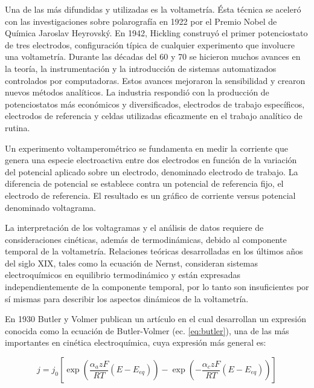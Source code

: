 		Una de las más difundidas y utilizadas es la voltametría. Ésta técnica se aceleró con las investigaciones sobre polarografía en 1922 por el Premio Nobel de Química Jaroslav Heyrovský.\cite{Zuman1960} En 1942, Hickling construyó el primer potenciostato de tres electrodos, configuración típica de cualquier experimento que involucre una voltametría. \cite{hickling1942} Durante las décadas del 60 y 70 se hicieron muchos avances en la teoría, la instrumentación y la introducción de sistemas automatizados controlados por computadoras. Estos avances mejoraron la sensibilidad y crearon nuevos métodos analíticos. La industria respondió con la producción de potenciostatos más económicos y diversificados, electrodos de trabajo específicos, electrodos de referencia y celdas utilizadas eficazmente en el trabajo analítico de rutina.\cite{Wi2000}

		Un experimento voltamperométrico se fundamenta en medir la corriente que genera una especie electroactiva entre dos electrodos en función de la variación del potencial aplicado sobre un electrodo, denominado electrodo de trabajo. La diferencia de potencial se establece contra un potencial de referencia fijo, el electrodo de referencia. El resultado es un gráfico de corriente versus potencial denominado voltagrama.

		La interpretación de los voltagramas y el análisis de datos requiere de consideraciones cinéticas, además de termodinámicas, debido al componente temporal de la voltametría. Relaciones teóricas desarrolladas en los últimos años del siglo XIX, tales como la ecuación de Nernst, consideran sistemas electroquímicos en equilibrio termodinámico y están expresadas independientemente de la componente temporal, por lo tanto son insuficientes por sí mismas para describir los aspectos dinámicos de la voltametría.\cite{nnnicholson1964}

		En 1930 Butler y Volmer publican un artículo en el cual desarrollan un expresión conocida como la ecuación de Butler-Volmer (ec. \ref{eq:butler}), una de las más importantes en cinética electroquímica, cuya expresión más general es\cite{Erdey-Gruz1930}: 

			\vspace*{3mm}
			\begin{equation}
			j=j_0\left[\exp\left(\frac{\alpha_azF}{RT}(E-E_{eq})\right)-\exp\left(-\frac{\alpha_czF}{RT}(E-E_{eq})\right)\right]
			\label{eq:butler}
			\end{equation}
			\vspace*{3mm}

